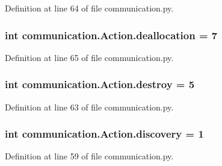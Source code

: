 Definition at line 64 of file communication.\+py.

\hypertarget{classcommunication_1_1Action_a396af30909af4f537ad93a1970ced10d}{}
\subsubsection[{deallocation}]{\setlength{\rightskip}{0pt plus 5cm}int communication.\+Action.\+deallocation = 7\hspace{0.3cm}{\ttfamily [static]}}\label{classcommunication_1_1Action_a396af30909af4f537ad93a1970ced10d}


Definition at line 65 of file communication.\+py.

\hypertarget{classcommunication_1_1Action_aecb68dde9b24828c7e924215be3401bf}{}
\subsubsection[{destroy}]{\setlength{\rightskip}{0pt plus 5cm}int communication.\+Action.\+destroy = 5\hspace{0.3cm}{\ttfamily [static]}}\label{classcommunication_1_1Action_aecb68dde9b24828c7e924215be3401bf}


Definition at line 63 of file communication.\+py.

\hypertarget{classcommunication_1_1Action_a7a4e4011b8c89920d11f5979c92d5a93}{}
\subsubsection[{discovery}]{\setlength{\rightskip}{0pt plus 5cm}int communication.\+Action.\+discovery = 1\hspace{0.3cm}{\ttfamily [static]}}\label{classcommunication_1_1Action_a7a4e4011b8c89920d11f5979c92d5a93}


Definition at line 59 of file communication.\+py.

\hypertarget{classcommunication_1_1Action_a605707caa83cf70de9a83822a7d9b557}{}
